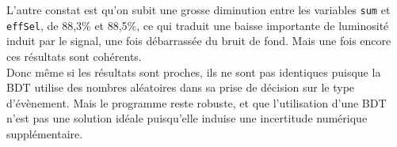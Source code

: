 L'autre constat est qu'on subit une grosse diminution entre les variables \texttt{sum} et \texttt{effSel}, de 88,3\% et 88,5\%, ce qui traduit une baisse importante de luminosité induit par le signal, une fois débarrassée du bruit de fond. Mais une fois encore ces résultats sont cohérents. \\

Donc même si les résultats sont proches, ils ne sont pas identiques puisque la BDT utilise des nombres aléatoires dans sa prise de décision sur le type d'évènement. Mais le programme reste robuste, et que l'utilisation d'une BDT n'est pas une solution idéale puisqu'elle induise une incertitude numérique supplémentaire.